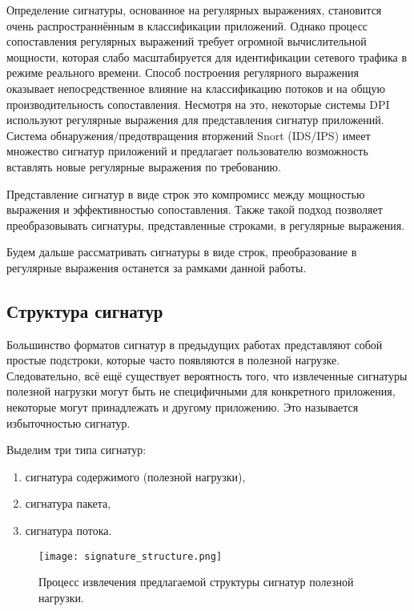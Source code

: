 Определение сигнатуры, основанное на регулярных выражениях, становится очень распространнённым в классификации приложений.
Однако процесс сопоставления регулярных выражений требует огромной вычислительной мощности,
которая слабо масштабируется для идентификации сетевого трафика в режиме реального времени.
Способ построения регулярного выражения оказывает непосредственное влияние на классификацию потоков и на общую производительность сопоставления.
Несмотря на это, некоторые системы DPI используют регулярные выражения для представления сигнатур приложений.
Система обнаружения/предотвращения вторжений Snort (IDS/IPS) \cite{Snort}
имеет множество сигнатур приложений и предлагает пользователю возможность вставлять новые регулярные выражения по требованию.

Представление сигнатур в виде строк это компромисс между мощностью выражения и эффективностью сопоставления.
Также такой подход позволяет преобразовывать сигнатуры, представленные строками, в регулярные выражения.

Будем дальше рассматривать сигнатуры в виде строк, преобразование в регулярные выражения останется за рамками данной работы.

\subsection{Структура сигнатур}

Большинство форматов сигнатур в предыдущих работах \cite{park2008towards,ye2009autosig,santosautomatic} представляют собой простые подстроки, которые часто появляются в полезной нагрузке.
Следовательно, всё ещё существует вероятность того, что извлеченные сигнатуры полезной нагрузки могут быть не специфичными для конкретного приложения,
некоторые могут принадлежать и другому приложению. Это называется избыточностью сигнатур.

Выделим три типа сигнатур:

\begin{enumerate}
    \item сигнатура содержимого (полезной нагрузки),
    \item сигнатура пакета,
    \item сигнатура потока.
\end{enumerate}

\begin{figure}[H]
    \begin{center}
        \texttt{[image: signature\_structure.png]}
        \caption{Процесс извлечения предлагаемой структуры сигнатур полезной нагрузки.}
    \end{center}
\end{figure}

